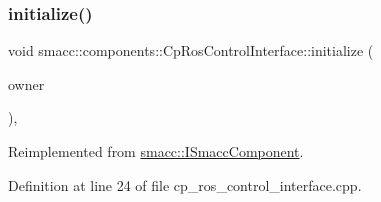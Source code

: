 \subsubsection{\texorpdfstring{initialize()}{initialize()}}
{\footnotesize\ttfamily void smacc\+::components\+::\+Cp\+Ros\+Control\+Interface\+::initialize (\begin{DoxyParamCaption}\item[{\hyperlink{classsmacc_1_1ISmaccClient}{I\+Smacc\+Client} $\ast$}]{owner }\end{DoxyParamCaption})\hspace{0.3cm}{\ttfamily [override]}, {\ttfamily [virtual]}}



Reimplemented from \hyperlink{classsmacc_1_1ISmaccComponent_a3378552cb1a86aa26a07c0edc057448b}{smacc\+::\+I\+Smacc\+Component}.



Definition at line 24 of file cp\+\_\+ros\+\_\+control\+\_\+interface.\+cpp.


